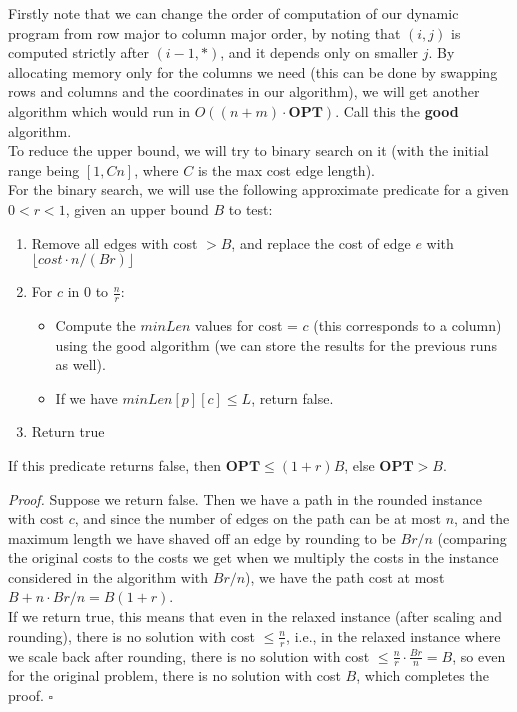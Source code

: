 \documentclass[a4paper]{article}
\newenvironment{proof}{\begin{breakbox}\textit{Proof.}}{\hfill$\square$\end{breakbox}}
\newcommand{\nl}{\vspace{0.2cm}\\}
\newcommand{\OPT}{\mathbf{OPT}}
\begin{document}
Firstly note that we can change the order of computation of our dynamic program from row major to column major order, by noting that $(i, j)$ is computed strictly after $(i - 1, *)$, and it
depends only on smaller $j$. By allocating memory only for the columns we need (this can be done by swapping rows and columns and the coordinates in our algorithm), we will get another algorithm
which would run in $O((n + m) \cdot \OPT)$. Call this the \textbf{good} algorithm.\nl
To reduce the upper bound, we will try to binary search on it (with the initial range being $[1, Cn]$, where $C$ is the max cost edge length).\nl
For the binary search, we will use the following approximate predicate for a given $0 < r < 1$, given an upper bound $B$ to test:

\begin{enumerate}
    \item Remove all edges with cost $> B$, and replace the cost of edge $e$ with $\lfloor cost \cdot n / (B r) \rfloor$
    \item For $c$ in $0$ to $\frac{n}{r}$:
        \begin{itemize}
            \item Compute the $minLen$ values for cost = $c$ (this corresponds to a column) using the good algorithm (we can store the results for the previous runs as well).
            \item If we have $minLen[p][c] \le L$, return false.
        \end{itemize}
    \item Return true
\end{enumerate}

\begin{claim}
    If this predicate returns false, then $\OPT \le (1 + r) B$, else $\OPT > B$.
\end{claim}
\begin{proof}
    Suppose we return false. Then we have a path in the rounded instance with cost $c$, and since the number of edges on the path can be at most $n$, and the maximum length we have shaved off an edge by
    rounding to be $Br/n$ (comparing the original costs to the costs we get when we multiply the costs in the instance considered in the algorithm with $Br/n$), we have the path cost at most $B + n \cdot Br / n = B(1 + r)$.\nl
    If we return true, this means that even in the relaxed instance (after scaling and rounding), there is no solution with cost $\le \frac{n}{r}$, i.e., in the relaxed instance where we scale back after
    rounding, there is no solution with cost $\le \frac{n}{r} \cdot \frac{Br}{n} = B$, so even for the original problem, there is no solution with cost $B$, which completes the proof.
\end{proof}
\end{document}
